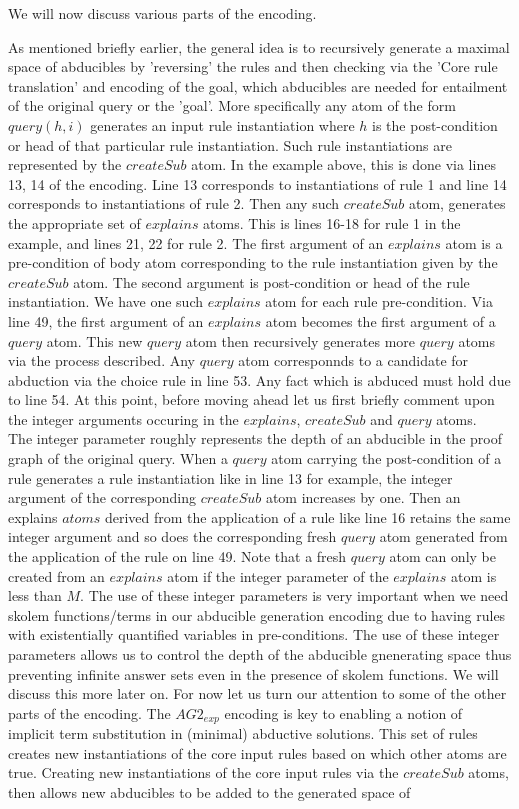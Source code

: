 \documentclass{article}
\begin{document}
We will now discuss various parts of the encoding.

As mentioned briefly earlier, the general idea is to recursively generate a maximal space of abducibles by 'reversing' the rules and then checking via the 'Core rule translation' and encoding of the goal, which abducibles are needed for entailment of the original query or the 'goal'. More specifically any atom of the form $query(h,i)$ generates an input rule instantiation where $h$ is the post-condition or head of that particular rule instantiation. Such rule instantiations are represented by the $createSub$ atom. In the example above, this is done via lines 13, 14 of the encoding. Line 13 corresponds to instantiations of rule 1 and line 14 corresponds to instantiations of rule 2. Then any such $createSub$ atom, generates the appropriate set of $explains$ atoms. This is lines 16-18 for rule 1 in the example, and lines 21, 22 for rule 2. The first argument of an $explains$ atom is a pre-condition of body atom corresponding to the rule instantiation given by the $createSub$ atom. The second argument is post-condition or head of the rule instantiation. We have one such $explains$ atom for each rule pre-condition. Via line 49, the first argument of an $explains$ atom becomes the first argument of a $query$ atom. This new $query$ atom then recursively generates more $query$ atoms via the process described. Any $query$ atom corresponnds to a candidate for abduction via the choice rule in line 53. Any fact which is abduced must hold due to line 54. At this point, before moving ahead let us first briefly comment upon the integer arguments occuring in the $explains$, $createSub$ and $query$ atoms.\\ The integer parameter roughly represents the depth of an abducible in the proof graph of the original query. When a $query$ atom carrying the post-condition of a rule generates a rule instantiation like in line 13 for example, the integer argument of the corresponding $createSub$ atom increases by one. Then an explains $atoms$ derived from the application of a rule like line 16 retains the same integer argument and so does the corresponding fresh $query$ atom generated from the application of the rule on line 49. Note that a fresh $query$ atom can only be created from an $explains$ atom if the integer parameter of the $explains$ atom is less than $M$. The use of these integer parameters is very important when we need skolem functions/terms in our abducible generation encoding due to having rules with existentially quantified variables in pre-conditions. The use of these integer parameters allows us to control the depth of the abducible gnenerating space thus preventing infinite answer sets even in the presence of skolem functions. We will discuss this more later on. For now let us turn our attention to some of the other parts of the encoding. The $AG2_{exp}$ encoding is key to enabling a notion of implicit term substitution in (minimal) abductive solutions. This set of rules creates new instantiations of the core input rules based on which other atoms are true. Creating new instantiations of the core input rules via the $createSub$ atoms, then allows new abducibles to be added to the generated space of 
\end{document}
